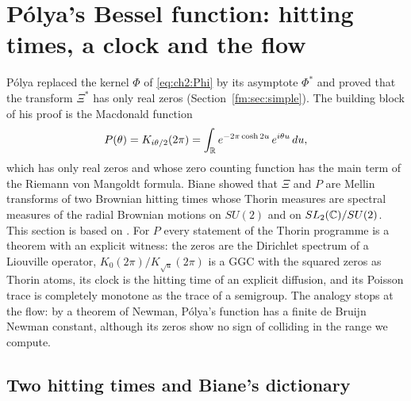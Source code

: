 \section{P\'olya's Bessel function: hitting times, a clock and the flow}\label{ch:biane}

P\'olya replaced the kernel $\Phi$ of \eqref{eq:ch2:Phi} by its asymptote $\Phi^*$ and proved that the transform $\Xi^*$ has only real zeros \cite{Polya} (Section~\ref{fm:sec:simple}). The building block of his proof is the Macdonald function
\begin{equation}\label{eq:biane:P}
P(\theta)=K_{i\theta/2}(2\pi)=\int_{\mathbb{R}}e^{-2\pi\cosh2u}\,e^{i\theta u}\,du,
\end{equation}
which has only real zeros and whose zero counting function has the main term of the Riemann von Mangoldt formula. Biane \cite{Biane09} showed that $\Xi$ and $P$ are Mellin transforms of two Brownian hitting times whose Thorin measures are spectral measures of the radial Brownian motions on $SU(2)$ and on $SL_2(\mathbb{C})/SU(2)$. This section is based on \cite{P26bia}. For $P$ every statement of the Thorin programme is a theorem with an explicit witness: the zeros are the Dirichlet spectrum of a Liouville operator, $K_0(2\pi)/K_{\sqrt u}(2\pi)$ is a GGC with the squared zeros as Thorin atoms, its clock is the hitting time of an explicit diffusion, and its Poisson trace is completely monotone as the trace of a semigroup. The analogy stops at the flow: by a theorem of Newman, P\'olya's function has a finite de Bruijn Newman constant, although its zeros show no sign of colliding in the range we compute.

\subsection{Two hitting times and Biane's dictionary}\label{sec:biane:hit}

